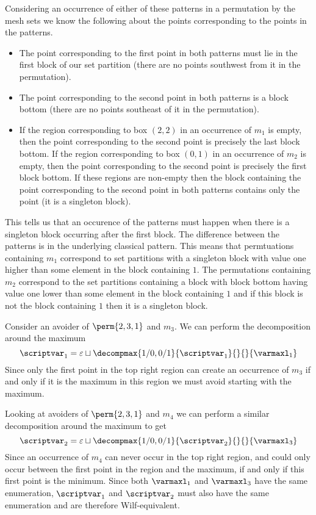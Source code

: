Considering an occurrence of either of these patterns in a permutation by
the mesh sets we know the following about the points corresponding
to the points in the patterns.
\begin{itemize}
    \item The point corresponding to the first point in both patterns
        must lie in the first block of our set partition (there are
        no points southwest from it in the permutation).
    \item The point corresponding to the second point in both patterns
        is a block bottom (there are no points southeast of it in
        the permutation).
    \item If the region corresponding to box \((2,2)\) in an occurrence of
    \(m_1\) is empty, then the point corresponding to the second point is
    precisely the last block bottom. If the region corresponding to box \((0,1)\)
    in an occurrence of \(m_2\) is empty, then the point corresponding to the
    second point is precisely the first block bottom.
    If these regions are non-empty then the block containing the point
    corresponding to the second point in both patterns contains only the point
    (it is a singleton block).
\end{itemize}
This tells us that an occurence of the patterns must happen when there
is a singleton block occurring after the first block. The difference
between the patterns is in the underlying classical pattern. This
means that permtuations containing \(m_1\) correspond to set partitions
with a singleton block with value one higher than some element in the
block containing \(1\). The permutations containing \(m_2\) correspond
to the set partitions containing a block with block bottom having value
one lower than some element in the block containing \(1\) and if this
block is not the block containing \(1\) then it is a singleton block.

Consider an avoider of \(\perm{2,3,1}\) and \(m_3\). We can perform
the decomposition around the maximum
\begin{equation*}
    \scriptvar_1 = \varepsilon \sqcup
    \decompmax{1/0,0/1}{\scriptvar_1}{}{}{\mathcal{\varmaxl}_1}
\end{equation*}
Since only the first point in the top right region can
create an occurrence of \(m_3\) if and only if it is the
maximum in this region we must avoid starting with the maximum.

Looking at avoiders of \(\perm{2,3,1}\) and \(m_4\) we
can perform a similar decomposition around the maximum to get
\begin{equation*}
    \scriptvar_2 = \varepsilon \sqcup
    \decompmax{1/0,0/1}{\scriptvar_2}{}{}{\mathcal{\varmaxl}_3}
\end{equation*}
Since an occurrence of \(m_4\) can never occur in the
top right region, and could only occur between the first point
in the region and the maximum, if and only if this first point is the minimum.
Since both \(\mathcal{\varmaxl}_1\) and \(\mathcal{\varmaxl}_3\) have the same
enumeration, \(\scriptvar_1\) and \(\scriptvar_2\) must also have
the same enumeration and are therefore Wilf-equivalent.

